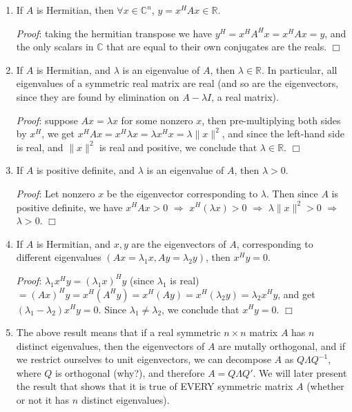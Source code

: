 \documentclass[12pt,oneside]{article}
\begin{document}
\begin{enumerate}
\item If $A$ is Hermitian, then $\forall x \in \mathbb{C}^n$, $y = x^H A x
  \in \mathbb{R}$.

\emph{Proof}: taking the hermitian transpose we have $y^H
  = x^H A^H x = x^H A x = y$, and the only scalars in $\mathbb{C}$
  that are equal to their own conjugates are the reals. $\Box$

\item If $A$ is Hermitian, and $\lambda$ is an eigenvalue of $A$, then
  $\lambda \in \mathbb{R}$. In particular, all eigenvalues of a
  symmetric real matrix are real (and so are the eigenvectors, since
  they are found by elimination on $A - \lambda I$, a real
  matrix).

\emph{Proof}: suppose $A x = \lambda x$ for some nonzero $x$, then
  pre-multiplying both sides by $x^H$, we get $x^H A x = x^H \lambda x
  = \lambda x^H x = \lambda \|x\|^2$, and since the left-hand side is
  real, and $\|x\|^2$ is real and positive, we conclude that $\lambda
  \in \mathbb{R}$. $\Box$

\item If $A$ is positive definite, and $\lambda$ is an eigenvalue of
  $A$, then $\lambda > 0$.

\emph{Proof}: Let nonzero $x$ be the
  eigenvector corresponding to $\lambda$. Then since $A$ is positive
  definite, we have $x^HAx > 0$ $\Longrightarrow$ $x^H (\lambda x) > 0$
  $\Longrightarrow$ $\lambda \|x\|^2 > 0$ $\Longrightarrow$ $\lambda >
  0$. $\Box$

\item If $A$ is Hermitian, and $x, y$ are the eigenvectors of $A$,
  corresponding to different eigenvalues $(Ax = \lambda_1 x, Ay =
  \lambda_2 y)$, then $x^H y = 0$.

\emph{Proof}: $\lambda_1 x^H y =
  (\lambda_1 x)^H y$ (since $\lambda_1$ is real) $= (Ax)^H y = x^H
  (A^H y) = x^H (A y) = x^H (\lambda_2 y) = \lambda_2 x^H y$, and get
  $(\lambda_1 - \lambda_2) x^H y = 0$. Since $\lambda_1 \neq
  \lambda_2$, we conclude that $x^H y = 0$. $\Box$


\item The above result means that if a real symmetric $n \times n$
  matrix $A$ has $n$ distinct eigenvalues, then the eigenvectors of
  $A$ are mutally orthogonal, and if we restrict ourselves to unit
  eigenvectors, we can decompose $A$ as $Q \Lambda Q^{-1}$, where
  $Q$ is orthogonal (why?), and therefore $A = Q \Lambda Q'$. We will
  later present the result that shows that it is true of EVERY
  symmetric matrix $A$ (whether or not it has $n$ distinct
  eigenvalues).



\end{enumerate}
\end{document}
